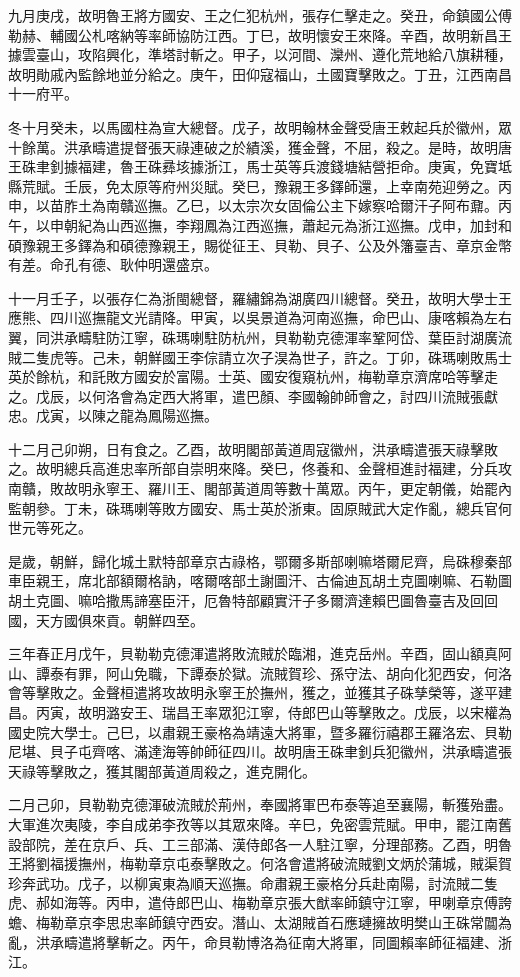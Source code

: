 \begin{pinyinscope}
九月庚戌，故明魯王將方國安、王之仁犯杭州，張存仁擊走之。癸丑，命鎮國公傅勒赫、輔國公札喀納等率師協防江西。丁巳，故明懷安王來降。辛酉，故明新昌王據雲臺山，攻陷興化，準塔討斬之。甲子，以河間、灤州、遵化荒地給八旗耕種，故明勛戚內監餘地並分給之。庚午，田仰寇福山，土國寶擊敗之。丁丑，江西南昌十一府平。

冬十月癸未，以馬國柱為宣大總督。戊子，故明翰林金聲受唐王敕起兵於徽州，眾十餘萬。洪承疇遣提督張天祿連破之於績溪，獲金聲，不屈，殺之。是時，故明唐王硃聿釗據福建，魯王硃彞垓據浙江，馬士英等兵渡錢塘結營拒命。庚寅，免寶坻縣荒賦。壬辰，免太原等府州災賦。癸巳，豫親王多鐸師還，上幸南苑迎勞之。丙申，以苗胙土為南贛巡撫。乙巳，以太宗次女固倫公主下嫁察哈爾汗子阿布鼐。丙午，以申朝紀為山西巡撫，李翔鳳為江西巡撫，蕭起元為浙江巡撫。戊申，加封和碩豫親王多鐸為和碩德豫親王，賜從征王、貝勒、貝子、公及外籓臺吉、章京金幣有差。命孔有德、耿仲明還盛京。

十一月壬子，以張存仁為浙閩總督，羅繡錦為湖廣四川總督。癸丑，故明大學士王應熊、四川巡撫龍文光請降。甲寅，以吳景道為河南巡撫，命巴山、康喀賴為左右翼，同洪承疇駐防江寧，硃瑪喇駐防杭州，貝勒勒克德渾率鞏阿岱、葉臣討湖廣流賊二隻虎等。己未，朝鮮國王李倧請立次子淏為世子，許之。丁卯，硃瑪喇敗馬士英於餘杭，和託敗方國安於富陽。士英、國安復窺杭州，梅勒章京濟席哈等擊走之。戊辰，以何洛會為定西大將軍，遣巴顏、李國翰帥師會之，討四川流賊張獻忠。戊寅，以陳之龍為鳳陽巡撫。

十二月己卯朔，日有食之。乙酉，故明閣部黃道周寇徽州，洪承疇遣張天祿擊敗之。故明總兵高進忠率所部自崇明來降。癸巳，佟養和、金聲桓進討福建，分兵攻南贛，敗故明永寧王、羅川王、閣部黃道周等數十萬眾。丙午，更定朝儀，始罷內監朝參。丁未，硃瑪喇等敗方國安、馬士英於浙東。固原賊武大定作亂，總兵官何世元等死之。

是歲，朝鮮，歸化城土默特部章京古祿格，鄂爾多斯部喇嘛塔爾尼齊，烏硃穆秦部車臣親王，席北部額爾格訥，喀爾喀部土謝圖汗、古倫迪瓦胡土克圖喇嘛、石勒圖胡土克圖、嘛哈撒馬諦塞臣汗，厄魯特部顧實汗子多爾濟達賴巴圖魯臺吉及回回國，天方國俱來貢。朝鮮四至。

三年春正月戊午，貝勒勒克德渾遣將敗流賊於臨湘，進克岳州。辛酉，固山額真阿山、譚泰有罪，阿山免職，下譚泰於獄。流賊賀珍、孫守法、胡向化犯西安，何洛會等擊敗之。金聲桓遣將攻故明永寧王於撫州，獲之，並獲其子硃孳榮等，遂平建昌。丙寅，故明潞安王、瑞昌王率眾犯江寧，侍郎巴山等擊敗之。戊辰，以宋權為國史院大學士。己巳，以肅親王豪格為靖遠大將軍，暨多羅衍禧郡王羅洛宏、貝勒尼堪、貝子屯齊喀、滿達海等帥師征四川。故明唐王硃聿釗兵犯徽州，洪承疇遣張天祿等擊敗之，獲其閣部黃道周殺之，進克開化。

二月己卯，貝勒勒克德渾破流賊於荊州，奉國將軍巴布泰等追至襄陽，斬獲殆盡。大軍進次夷陵，李自成弟李孜等以其眾來降。辛巳，免密雲荒賦。甲申，罷江南舊設部院，差在京戶、兵、工三部滿、漢侍郎各一人駐江寧，分理部務。乙酉，明魯王將劉福援撫州，梅勒章京屯泰擊敗之。何洛會遣將破流賊劉文炳於蒲城，賊渠賀珍奔武功。戊子，以柳寅東為順天巡撫。命肅親王豪格分兵赴南陽，討流賊二隻虎、郝如海等。丙申，遣侍郎巴山、梅勒章京張大猷率師鎮守江寧，甲喇章京傅誇蟾、梅勒章京李思忠率師鎮守西安。潛山、太湖賊首石應璉擁故明樊山王硃常闒為亂，洪承疇遣將擊斬之。丙午，命貝勒博洛為征南大將軍，同圖賴率師征福建、浙江。


\end{pinyinscope}
